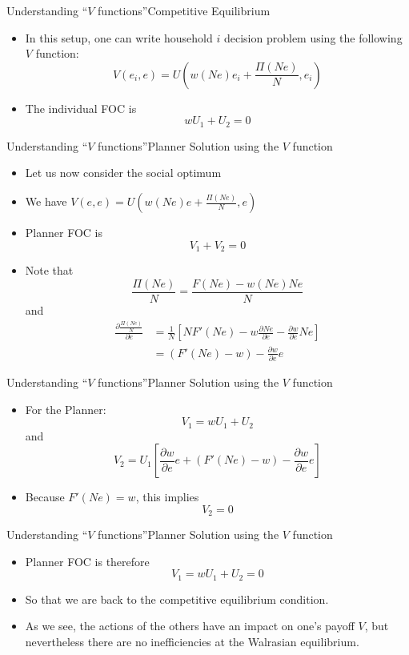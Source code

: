 \documentclass[aspectratio=169,handout]{beamer}
\begin{document}
\begin{frame}{Understanding ``$V$ functions''}{Competitive Equilibrium}


\begin{itemize}
\item In this setup, one can write household $i$ decision problem using the  following $V$ function: 
$$
V(e_{i}, e) = U\left(w(Ne) e_{i} + \frac{\Pi(Ne)}{N},e_{i}\right)
$$
\item The individual FOC is 
$$
w U_{1} + U_{2} = 0
$$
\end{itemize}
\end{frame}


\begin{frame}{Understanding ``$V$ functions''}{Planner Solution using the $V$ function}

\begin{itemize}
\item Let us now consider the social optimum
\item We have $V(e, e) = U\left(w(Ne) e + \frac{\Pi(Ne)}{N},e\right)$
\item Planner FOC is 
$$
V_{1}+V_{2}=0
$$
\item Note that
$$
\frac{\Pi(Ne)}{N} = \frac{F(Ne) - w(Ne)Ne}{N}
$$
and
\begin{align*}
\frac{\partial\frac{\Pi(Ne)}{N}}{\partial e} &= \frac{1}{N} \left[NF'(Ne) - w \frac{\partial Ne}{\partial e} - \frac{\partial w}{\partial e} Ne\right]\\
&= \left(F'(Ne) -w\right)  -\frac{\partial w}{\partial e} e
\end{align*}

\end{itemize}
\end{frame}


\begin{frame}{Understanding ``$V$ functions''}{Planner Solution using the $V$ function}

\begin{itemize}
\item For the Planner:
$$
V_{1} = w U_{1} + U_{2}
$$
and
$$
V_{2} = U_{1} \left[\frac{\partial w}{\partial e} e + \left(F'(Ne) -w\right) -\frac{\partial w}{\partial e} e\right]
$$
\item Because $F'(N e)=w$, this implies 
$$
V_{2} = 0
$$

\end{itemize}
\end{frame}


\begin{frame}{Understanding ``$V$ functions''}{Planner Solution using the $V$ function}

\begin{itemize}
\item Planner FOC is  therefore
$$
V_{1}= w U_{1} + U_{2}=0
$$
\item So that we are back to the competitive equilibrium condition. 
\item As we see, the actions of the others have an impact on one's payoff $V$, but nevertheless there are no inefficiencies at the Walrasian equilibrium. 
\end{itemize}
\end{frame}
\end{document}
